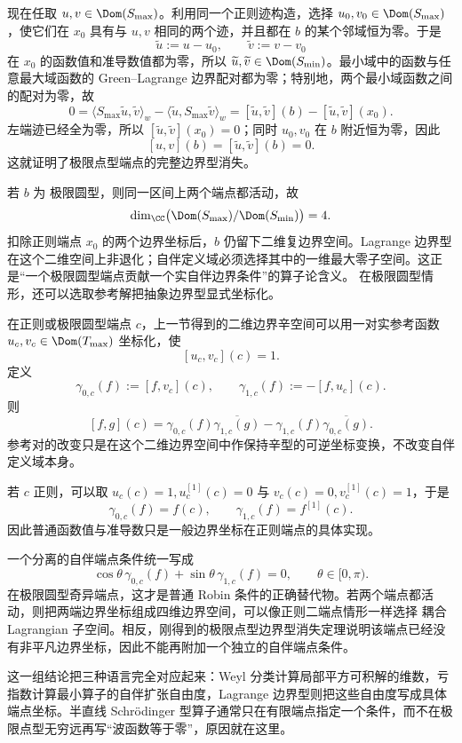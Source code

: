 现在任取 $u,v\in\Dom(S_{\max})$。利用同一个正则迹构造，选择 $u_0,v_0\in\Dom(S_{\max})$，使它们在 $x_0$ 具有与 $u,v$ 相同的两个迹，并且都在 $b$ 的某个邻域恒为零。于是
\[
 \widetilde u:=u-u_0,
 \qquad
 \widetilde v:=v-v_0
\]
在 $x_0$ 的函数值和准导数值都为零，所以 $\widetilde u,\widetilde v\in\Dom(S_{\min})$。最小域中的函数与任意最大域函数的 Green--Lagrange 边界配对都为零；特别地，两个最小域函数之间的配对为零，故
\[
 0=
 \langle S_{\max}\widetilde u,\widetilde v\rangle_w
 -\langle \widetilde u,S_{\max}\widetilde v\rangle_w
 =[\widetilde u,\widetilde v](b)-[\widetilde u,\widetilde v](x_0).
\]
左端迹已经全为零，所以 $[\widetilde u,\widetilde v](x_0)=0$；同时 $u_0,v_0$ 在 $b$ 附近恒为零，因此
\[
 [u,v](b)=[\widetilde u,\widetilde v](b)=0.
\]
这就证明了极限点型端点的完整边界型消失。

若 $b$ 为 极限圆型，则同一区间上两个端点都活动，故
\[
 \dim_\CC\bigl(\Dom(S_{\max})/\Dom(S_{\min})\bigr)=4.
\]
扣除正则端点 $x_0$ 的两个边界坐标后，$b$ 仍留下二维复边界空间。Lagrange 边界型在这个二维空间上非退化；自伴定义域必须选择其中的一维最大零子空间。这正是“一个极限圆型端点贡献一个实自伴边界条件”的算子论含义。
在极限圆型情形，还可以选取参考解把抽象边界型显式坐标化。

在正则或极限圆型端点 $c$，上一节得到的二维边界辛空间可以用一对实参考函数 $u_c,v_c\in\Dom(T_{\max})$ 坐标化，使
\[
 [u_c,v_c](c)=1.
\]
定义
\[
 \gamma_{0,c}(f):=[f,v_c](c),
 \qquad
 \gamma_{1,c}(f):=-[f,u_c](c).
\]
则
\[
 [f,g](c)
 =\gamma_{0,c}(f)\overline{\gamma_{1,c}(g)}
 -\gamma_{1,c}(f)\overline{\gamma_{0,c}(g)}.
\]
参考对的改变只是在这个二维边界空间中作保持辛型的可逆坐标变换，不改变自伴定义域本身。

若 $c$ 正则，可以取 $u_c(c)=1,u_c^{[1]}(c)=0$ 与
$v_c(c)=0,v_c^{[1]}(c)=1$，于是
\[
 \gamma_{0,c}(f)=f(c),
 \qquad
 \gamma_{1,c}(f)=f^{[1]}(c).
\]
因此普通函数值与准导数只是一般边界坐标在正则端点的具体实现。

一个分离的自伴端点条件统一写成
\[
 \cos\theta\,\gamma_{0,c}(f)
 +\sin\theta\,\gamma_{1,c}(f)=0,
 \qquad \theta\in[0,\pi).
\]
在极限圆型奇异端点，这才是普通 Robin 条件的正确替代物。若两个端点都活动，则把两端边界坐标组成四维边界空间，可以像正则二端点情形一样选择 耦合 Lagrangian 子空间。相反，刚得到的极限点型边界型消失定理说明该端点已经没有非平凡边界坐标，因此不能再附加一个独立的自伴端点条件。

这一组结论把三种语言完全对应起来：Weyl 分类计算局部平方可积解的维数，亏指数计算最小算子的自伴扩张自由度，Lagrange 边界型则把这些自由度写成具体端点坐标。半直线 Schrödinger 型算子通常只在有限端点指定一个条件，而不在极限点型无穷远再写“波函数等于零”，原因就在这里。

